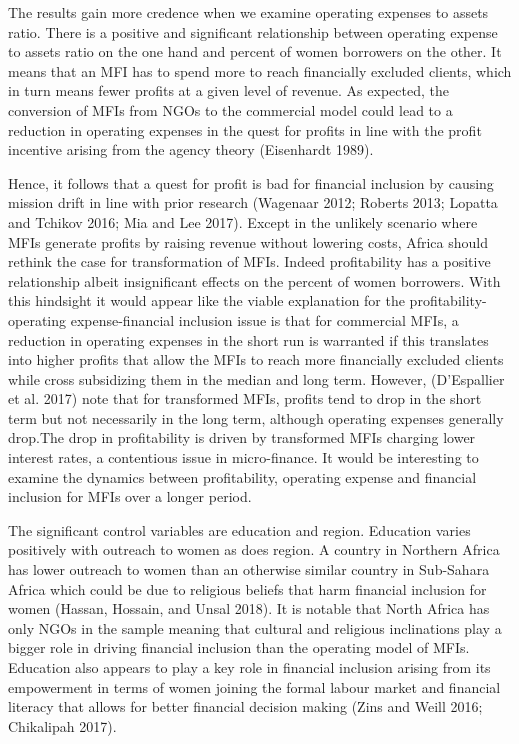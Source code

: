 \documentclass[
]{article}
\begin{document}
The results gain more credence when we examine operating expenses to
assets ratio. There is a positive and significant relationship between
operating expense to assets ratio on the one hand and percent of women
borrowers on the other. It means that an MFI has to spend more to reach
financially excluded clients, which in turn means fewer profits at a
given level of revenue. As expected, the conversion of MFIs from NGOs to
the commercial model could lead to a reduction in operating expenses in
the quest for profits in line with the profit incentive arising from the
agency theory (Eisenhardt 1989).

Hence, it follows that a quest for profit is bad for financial inclusion
by causing mission drift in line with prior research (Wagenaar 2012;
Roberts 2013; Lopatta and Tchikov 2016; Mia and Lee 2017). Except in the
unlikely scenario where MFIs generate profits by raising revenue without
lowering costs, Africa should rethink the case for transformation of
MFIs. Indeed profitability has a positive relationship albeit
insignificant effects on the percent of women borrowers. With this
hindsight it would appear like the viable explanation for the
profitability-operating expense-financial inclusion issue is that for
commercial MFIs, a reduction in operating expenses in the short run is
warranted if this translates into higher profits that allow the MFIs to
reach more financially excluded clients while cross subsidizing them in
the median and long term. However, (D'Espallier et al. 2017) note that
for transformed MFIs, profits tend to drop in the short term but not
necessarily in the long term, although operating expenses generally
drop.The drop in profitability is driven by transformed MFIs charging
lower interest rates, a contentious issue in micro-finance. It would be
interesting to examine the dynamics between profitability, operating
expense and financial inclusion for MFIs over a longer period.

The significant control variables are education and region. Education
varies positively with outreach to women as does region. A country in
Northern Africa has lower outreach to women than an otherwise similar
country in Sub-Sahara Africa which could be due to religious beliefs
that harm financial inclusion for women (Hassan, Hossain, and Unsal
2018). It is notable that North Africa has only NGOs in the sample
meaning that cultural and religious inclinations play a bigger role in
driving financial inclusion than the operating model of MFIs. Education
also appears to play a key role in financial inclusion arising from its
empowerment in terms of women joining the formal labour market and
financial literacy that allows for better financial decision making
(Zins and Weill 2016; Chikalipah 2017).
\end{document}
